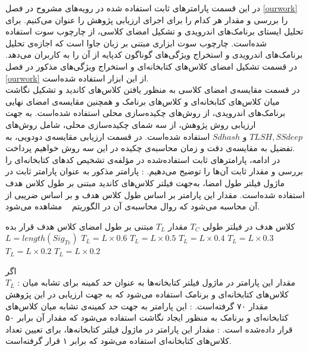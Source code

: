 در این قسمت پارامتر‌های ثابت استفاده شده در رویه‌های مشروح در فصل \ref{ourwork}
را بررسی و مقدار هر کدام را برای اجرای ارزیابی‌ پژوهش را عنوان می‌کنیم.
 برای تحلیل ایستا‌ی برنامک‌های اندرویدی و تشکیل امضای کلاسی، از چارچوب سوت استفاده شده‌است. چارچوب سوت ابزاری‌ مبتنی بر زبان جاوا است که اجازه‌ی تحلیل برنامک‌های اندرویدی و استخراج ویژگی‌های گوناگون کد‌پایه از آن را به کاربران می‌دهد. در قسمت تشکیل امضای کلاس‌های کتابخانه‌ای و استخراج ویژگی‌های مذکور در فصل
\ref{ourwork}
از این ابزار استفاده شده‌‌است.\\
در قسمت مقایسه‌‌ی امضا‌ی کلاسی به منظور یافتن کلاس‌های کاندید و تشکیل نگاشت میان کلاس‌های کتابخانه‌ای و کلاس‌ها‌ی برنامک و همچنین مقایسه‌ی امضای نهایی برنامک‌های اندرویدی، از روش‌‌های چکیده‌سازی محلی استفاده شده‌است. به جهت ارزیابی روش پژوهش، از سه شمای چکیده‌سازی محلی، شامل روش‌های $TLSH,SSdeep$ و $Sdhash$ استفاده شده‌است. در قسمت ارزیابی مقایسه‌ی دودویی، به تفضیل به مقایسه‌ی دقت و زمان محاسبه‌ی چکیده در این سه روش خواهیم پرداخت.\\
در ادامه، پارامتر‌های ثابت استفاده‌شده در مؤلفه‌ی تشخیص کد‌های کتابخانه‌ای را بررسی و مقدار ثابت‌ آن‌ها را توضیح می‌دهیم.
: پارامتر مذکور به عنوان پارامتر ثابت در ماژول فیلتر طول امضا، به‌جهت فیلتر کلاس‌‌های کاندید مبتنی بر طول کلاس هدف استفاده شده‌است. مقدار این پارامتر بر اساس طول کلاس هدف و بر اساس ضریبی از آن محاسبه می‌شود که روال محاسبه‌ی آن در الگوریتم ~ مشاهده می‌شود.

 کلاس هدف در فیلتر طولی $T_C$
 مقدار $T_L$ مبتنی بر طول امضای کلاس هدف
 قرار بده 
$L=length(Sig_{Tc})$
$T_{L} = L \times 0.6$
$T_{L} = L \times 0.5$
$T_{L} = L \times 0.4$
$T_{L} = L \times 0.3$
$T_{L} = L \times 0.2$
$T_{L} = L \times 0.2$

‌اگر\\
 $T_{L}$
: مقدار این پارامتر در ماژول فیلتر کتابخانه‌ها به عنوان حد کمینه برای تشابه میان کلاس‌های کتابخانه‌ای و برنامک استفاده می‌شود که به جهت ارزیابی در این پژوهش مقدار ۷۰ گرفته‌است.
: این پارامتر به جهت حد کمینه‌ی تشابه میان کلاس‌های کتابخانه‌ای و برنامک به منظور ایجاد نگاشت استفاده می‌شود که مقدار آن برابر ۵۰ قرار داده‌شده است.
: مقدار این پارامتر در ماژول فیلتر کتابخانه‌ها، برای تعیین تعداد کلاس‌های کتابخانه‌ای استفاده می‌شود که برابر ۱ قرار گرفته‌است.


